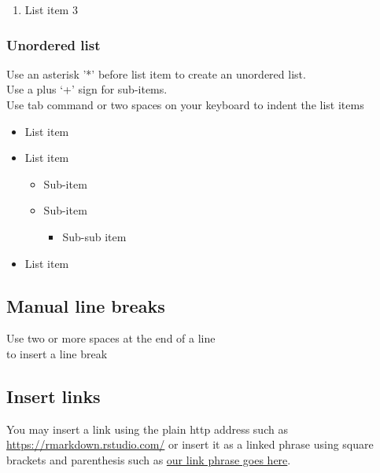 \documentclass[
]{book}
\providecommand{\tightlist}{%
  \setlength{\itemsep}{0pt}\setlength{\parskip}{0pt}}
\begin{document}
\begin{enumerate}
\def\labelenumi{\arabic{enumi}.}
\setcounter{enumi}{2}
\tightlist
\item
  List item 3
\end{enumerate}

\hypertarget{unordered-list}{%
\subsubsection{Unordered list}\label{unordered-list}}

Use an asterisk '*' before list item to create an unordered list.\\
Use a plus `+' sign for sub-items.\\
Use tab command or two spaces on your keyboard to indent the list items

\begin{itemize}
\tightlist
\item
  List item
\item
  List item

  \begin{itemize}
  \tightlist
  \item
    Sub-item
  \item
    Sub-item

    \begin{itemize}
    \tightlist
    \item
      Sub-sub item
    \end{itemize}
  \end{itemize}
\item
  List item
\end{itemize}

\hypertarget{manual-line-breaks}{%
\subsection{Manual line breaks}\label{manual-line-breaks}}

Use two or more spaces at the end of a line\\
to insert a line break

\hypertarget{insert-links}{%
\subsection{Insert links}\label{insert-links}}

You may insert a link using the plain http address such as \url{https://rmarkdown.rstudio.com/} or insert it as a linked phrase using square brackets and parenthesis such as \href{https://rmarkdown.rstudio.com/}{our link phrase goes here}.
\end{document}
